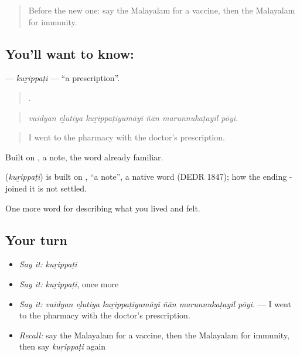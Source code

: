 \label{lesson:ML-C533-kurippati}



\begin{quote}
Before the new one: say the Malayalam for a vaccine, then the Malayalam for immunity.
\end{quote}

\subsection*{You'll want to know: }
\textbf{} — \emph{kuṟippaṭi} — \textquotedblleft{}a prescription\textquotedblright{}.

\begin{quote}
     .
\end{quote}

\begin{quote}
\emph{vaidyan eḻutiya kuṟippaṭiyumāyi ñān marunnukaṭayil pōyi.}
\end{quote}

\begin{quote}
I went to the pharmacy with the doctor's prescription.
\end{quote}

Built on , a note, the word already familiar.

\begin{cousinweb}
\textbf{} (\emph{kuṟippaṭi}) is built on , \textquotedblleft{}a note\textquotedblright{}, a native word (DEDR 1847); how the ending - joined it is not settled.
\end{cousinweb}

\begin{grammarlens}[title={What you've built}]
One more word for describing what you lived and felt.
\end{grammarlens}

\subsection*{Your turn}
\begin{itemize}
\raggedright
  \item \emph{Say it:} \emph{kuṟippaṭi}
  \item \emph{Say it:} \emph{kuṟippaṭi}, once more
  \item \emph{Say it:} \emph{vaidyan eḻutiya kuṟippaṭiyumāyi ñān marunnukaṭayil pōyi.} — I went to the pharmacy with the doctor's prescription.
  \item \emph{Recall:} say the Malayalam for a vaccine, then the Malayalam for immunity, then say \emph{kuṟippaṭi} again
\end{itemize}

